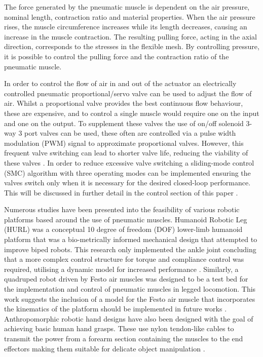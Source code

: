 \documentclass[11pt,a4paper]{article}
\begin{document}
The force generated by the pneumatic muscle is dependent on the air pressure, nominal length, contraction ratio and material properties. When the air pressure rises, the muscle circumference increases while its length decreases, causing an increase in the muscle contraction. The resulting pulling force, acting in the axial direction, corresponds to the stresses in the flexible mesh. By controlling pressure, it is possible to control the pulling force and the contraction ratio of the pneumatic muscle. \newline

In order to control the flow of air in and out of the actuator an electrically controlled pneumatic proportional/servo valve can be used to adjust the flow of air. Whilst a proportional valve provides the best continuous flow behaviour, these are expensive, and to control a single muscle would require one on the input and one on the output. To supplement these valves the use of on/off solenoid 3-way 3 port valves can be used, these often are controlled via a pulse width modulation (PWM) signal to approximate proportional valves. However, this frequent valve switching can lead to shorter valve life, reducing the viability of these valves \cite{zhang_bone_2018}. In order to reduce excessive valve switching a sliding-mode control (SMC) algorithm with three operating modes can be implemented ensuring the valves switch only when it is necessary for the desired closed-loop performance. This will be discussed in further detail in the control section of this paper . \newline

Numerous studies have been presented into the feasibility of various robotic platforms based around the use of pneumatic muscles. Humanoid Robotic Leg (HURL) was a conceptual 10 degree of freedom (DOF) lower-limb humanoid platform that was a bio-metrically informed mechanical design that attempted to improve biped robots. This research only implemented the ankle joint concluding that a more complex control structure for torque and compliance control was required, utilising a dynamic model for increased performance \cite{andrikopoulos_nikolakopoulos_2017}. Similarly, a quadruped robot driven by Festo air muscles was designed to be a test bed for the implementation and control of pneumatic muscles in legged locomotion. This work suggests the inclusion of a model for the Festo air muscle that incorporates the kinematics of the platform should be implemented in future works \cite{aschenbeck_kern_bachmann_quinn}. Anthropomorphic robotic hand designs have also been designed with the goal of achieving basic human hand grasps. These use nylon tendon-like cables to transmit the power from a forearm section containing the muscles to the end effectors making them suitable for delicate object manipulation \cite{lau_chai_2012}.
\end{document}
